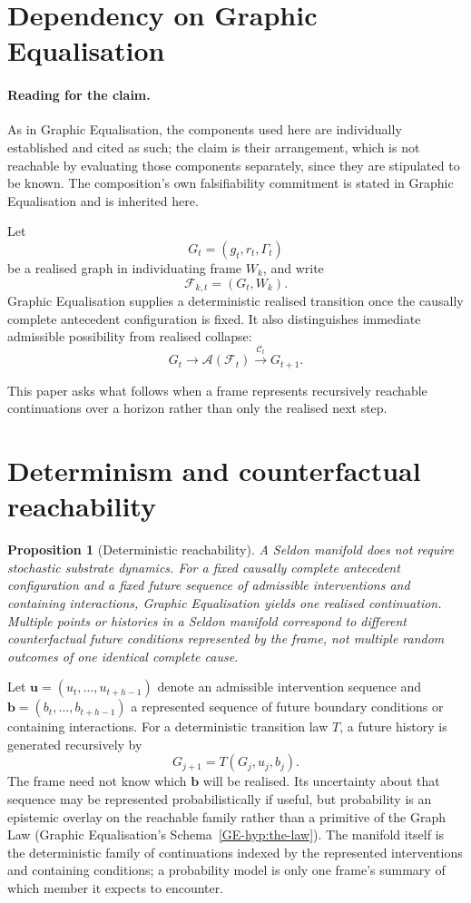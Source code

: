 \documentclass[11pt,a4paper]{article}
\newtheorem{proposition}[definition]{Proposition}
\theoremstyle{remark}
\newcommand{\Frame}{\mathcal F}
\newcommand{\Aset}{\mathcal A}
\begin{document}
\section{Dependency on Graphic Equalisation}\label{sec:dependency}

\paragraph{Reading for the claim.}
As in Graphic Equalisation, the components used here are individually established and cited as such; the claim is their arrangement, which is not reachable by evaluating those components separately, since they are stipulated to be known. The composition's own falsifiability commitment is stated in Graphic Equalisation and is inherited here.

Let
\[
G_t=(g_t,r_t,\Gamma_t)
\]
be a realised graph in individuating frame $W_k$, and write
\[
\Frame_{k,t}=(G_t,W_k).
\]
Graphic Equalisation supplies a deterministic realised transition once the causally complete antecedent configuration is fixed. It also distinguishes immediate admissible possibility from realised collapse:
\[
G_t\longrightarrow\Aset(\Frame_t)\xrightarrow{\mathcal C_t}G_{t+1}.
\]

This paper asks what follows when a frame represents recursively reachable continuations over a horizon rather than only the realised next step.

\section{Determinism and counterfactual reachability}\label{sec:determinism}

\begin{proposition}[Deterministic reachability]\label{prop:det-reach}
A Seldon manifold does not require stochastic substrate dynamics. For a fixed causally complete antecedent configuration and a fixed future sequence of admissible interventions and containing interactions, Graphic Equalisation yields one realised continuation. Multiple points or histories in a Seldon manifold correspond to different counterfactual future conditions represented by the frame, not multiple random outcomes of one identical complete cause.
\end{proposition}

Let $\mathbf u=(u_t,\ldots,u_{t+h-1})$ denote an admissible intervention sequence and $\mathbf b=(b_t,\ldots,b_{t+h-1})$ a represented sequence of future boundary conditions or containing interactions. For a deterministic transition law $T$, a future history is generated recursively by
\[
G_{j+1}=T(G_j,u_j,b_j).
\]
The frame need not know which $\mathbf b$ will be realised. Its uncertainty about that sequence may be represented probabilistically if useful, but probability is an epistemic overlay on the reachable family rather than a primitive of the Graph Law
(Graphic Equalisation's Schema~\ref{GE-hyp:the-law}). The manifold itself is the deterministic
family of continuations indexed by the represented interventions and containing conditions; a
probability model is only one frame's summary of which member it expects to encounter.
\end{document}
